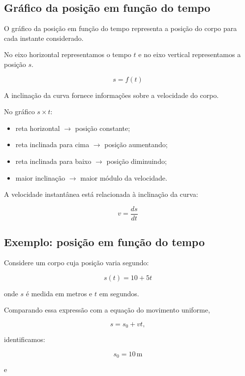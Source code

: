 \documentclass[a4paper,12pt]{article}
\begin{document}
\subsection{Gráfico da posição em função do tempo}

O gráfico da posição em função do tempo representa a posição do corpo para
cada instante considerado.

No eixo horizontal representamos o tempo $t$ e no eixo vertical representamos
a posição $s$.

\[
s = f(t)
\]

A inclinação da curva fornece informações sobre a velocidade do corpo.

\begin{ideia}

No gráfico $s \times t$:

\begin{itemize}
    \item reta horizontal $\rightarrow$ posição constante;
    \item reta inclinada para cima $\rightarrow$ posição aumentando;
    \item reta inclinada para baixo $\rightarrow$ posição diminuindo;
    \item maior inclinação $\rightarrow$ maior módulo da velocidade.
\end{itemize}

A velocidade instantânea está relacionada à inclinação da curva:

\[
v = \frac{ds}{dt}
\]

\end{ideia}

\subsection{Exemplo: posição em função do tempo}

Considere um corpo cuja posição varia segundo:

\[
s(t)=10+5t
\]

onde $s$ é medida em metros e $t$ em segundos.

Comparando essa expressão com a equação do movimento uniforme,

\[
s=s_0+vt,
\]

identificamos:

\[
s_0=10\,\text{m}
\]

e
\end{document}
